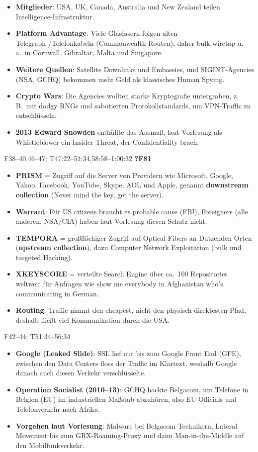 \documentclass[10pt,a4paper]{article}
\newcommand{\block}[2]{\par\vspace{3pt}{\bfseries #1}\hfill{\scriptsize #2}\par\nopagebreak}
\begin{document}
\begin{itemize}
\item \textbf{Mitglieder}: USA, UK, Canada, Australia und New Zealand teilen Intelligence-Infrastruktur.
\item \textbf{Platform Advantage}: Viele Glasfasern folgen alten Telegraph-/Telefonkabeln (Commonwealth-Routen), daher bulk wiretap u.\,a.\ in Cornwall, Gibraltar, Malta und Singapore.
\item \textbf{Weitere Quellen}: Satellite Downlinks und Embassies, und SIGINT-Agencies (NSA, GCHQ) bekommen mehr Geld als klassisches Human Spying.
\item \textbf{Crypto Wars}: Die Agencies wollten starke Kryptografie untergraben, z.\,B.\ mit dodgy RNGs und sabotierten Protokollstandards, um VPN-Traffic zu entschlüsseln.
\item \textbf{2013 Edward Snowden} enthüllte das Ausmaß, laut Vorlesung als Whistleblower ein Insider Threat, der Confidentiality brach.
\end{itemize}
\block{PRISM, TEMPORA, XKEYSCORE}{F38--40,46--47; T47:22--51:34,58:58--1:00:32 \quad \textbf{?F81}}
\begin{itemize}
\item \textbf{PRISM} = Zugriff auf die Server von Providern wie Microsoft, Google, Yahoo, Facebook, YouTube, Skype, AOL und Apple, genannt \textbf{downstream collection} (\glqq Never mind the key, get the server\grqq).
\item \textbf{Warrant}: Für US citizens braucht es probable cause (FBI), Foreigners (alle anderen, NSA/CIA) haben laut Vorlesung diesen Schutz nicht.
\item \textbf{TEMPORA} = großflächiger Zugriff auf Optical Fibers an Dutzenden Orten (\textbf{upstream collection}), dazu Computer Network Exploitation (bulk und targeted Hacking).
\item \textbf{XKEYSCORE} = verteilte Search Engine über ca.\ 100 Repositories weltweit für Anfragen wie \glqq show me everybody in Afghanistan who's communicating in German\grqq.
\item \textbf{Routing}: Traffic nimmt den cheapest, nicht den physisch direktesten Pfad, deshalb fließt viel Kommunikation durch die USA.
\end{itemize}
\block{Five Eyes: zwei Fallbeispiele}{F42--44; T51:34--56:34}
\begin{itemize}
\item \textbf{Google (Leaked Slide)}: SSL lief nur bis zum Google Front End (GFE), zwischen den Data Centers floss der Traffic im Klartext, weshalb Google danach auch diesen Verkehr verschlüsselte.
\item \textbf{Operation Socialist (2010--13)}: GCHQ hackte Belgacom, um Telefone in Belgien (EU) im industriellen Maßstab abzuhören, also EU-Officials und Telefonverkehr nach Afrika.
\item \textbf{Vorgehen laut Vorlesung}: Malware bei Belgacom-Technikern, Lateral Movement bis zum GRX-Roaming-Proxy und dann Man-in-the-Middle auf den Mobilfunkverkehr.
\end{itemize}
\end{document}

